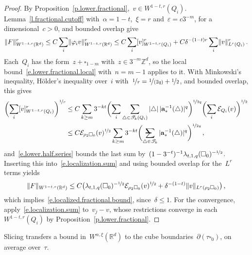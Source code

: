 \documentclass[11pt,letterpaper]{article}
\makeatletter
\numberwithin{equation}{section}
\theoremstyle{definition}
\newcommand{\Rd}{\mathbb{R}^d}
\newcommand{\Zd}{\mathbb{Z}^d}
\renewcommand{\a}{\mathbf{a}}
\newcommand{\nf}{\nicefrac}
\newcommand{\cu}{\square}
\DeclarePairedDelimiter{\norm}{\lVert}{\rVert}
\newcommand{\Ener}{\mathcal E}
\newcommand{\avsum}{\mathop{\mathpalette\avsuminner\relax}\displaylimits}
\newcommand\avsuminner[2]{%
	{\sbox0{$\m@th#1\sum$}%
		\vphantom{\usebox0}%
		\ooalign{%
			\hidewidth
			\smash{\,\rule[.23em]{8.8pt}{1.1pt} \relax}%
			\hidewidth\cr
			$\m@th#1\sum$\cr
		}%
	}%
}
\makeatother
\begin{document}
\begin{proof}
By Proposition~\ref{p.lower.fractional},~$v\in W^{1-t,r}(Q_i)$. Lemma~\ref{l.fractional.cutoff} with~$\alpha=1-t$,~$\xi=r$ and~$\varepsilon=c3^{-m}$, for a dimensional~$c>0$, and bounded overlap give
\begin{equation}
	\norm{F}_{W^{1-t,r}(\Rd)}^r\leq C\sum_i\norm{\varphi_iv}_{W^{1-t,r}(\Rd)}^r\leq C\sum_i[v]_{W^{1-t,r}(Q_i)}^r+C\delta^{-(1-t)r}\sum_i\norm{v}_{L^r(Q_i)}^r\,.
	\label{e.localization.sum}
\end{equation}
Each~$Q_i$ has the form~$z+\cu_{1-m}$ with~$z\in3^{-m}\Zd$, so the local bound~\eqref{e.lower.fractional.local} with~$n=m-1$ applies to it. With Minkowski's inequality, H\"older's inequality over~$i$ with~$\nf1r=\nf1{(2q)}+\nf12$, and bounded overlap, this gives
\begin{align*}
	\biggl(\sum_i[v]_{W^{1-t,r}(Q_i)}^r\biggr)^{\nf1r}&\leq C\sum_{k\geq m}3^{-kt}\biggl(\sum_i\sum_{\triangle\in\mathscr T_k(Q_i)}|\triangle|\,|\a_*^{-1}(\triangle)|^q\biggr)^{\nf1{2q}}\biggl(\sum_i\Ener_{Q_i}(v)\biggr)^{\nf12}\\
	&\leq C\Ener_{\rho_2\cu_0}(v)^{\nf12}\sum_{k\geq m}3^{-kt}\biggl(\avsum_{\triangle\in\mathscr T_k}|\a_*^{-1}(\triangle)|^q\biggr)^{\nf1{2q}}\,,
\end{align*}
and~\eqref{e.lower.half.series} bounds the last sum by~$(1-3^{-t})^{-1}\lambda_{t,1,q}(\cu_0)^{-\nf12}$. Inserting this into~\eqref{e.localization.sum} and using bounded overlap for the~$L^r$ terms yields
\begin{equation*}
	\norm{F}_{W^{1-t,r}(\Rd)}\leq C\bigl(\lambda_{t,1,q}(\cu_0)^{-\nf12}\Ener_{\rho_2\cu_0}(v)^{\nf12}+\delta^{-(1-t)}\norm{v}_{L^r(\rho_2\cu_0)}\bigr)\,,
\end{equation*}
which implies~\eqref{e.localized.fractional.bound}, since~$\delta\leq1$. For the convergence, apply~\eqref{e.localization.sum} to~$v_j-v$, whose restrictions converge in each~$W^{1-t,r}(Q_i)$ by Proposition~\ref{p.lower.fractional}.
\end{proof}

Slicing transfers a bound in~$W^{\alpha,\xi}(\Rd)$ to the cube boundaries~$\partial(\tau\cu_0)$, on average over~$\tau$.
\end{document}
